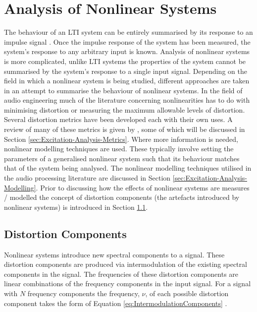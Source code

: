 \section{Analysis of Nonlinear Systems}
\label{sec:Excitation-AnalysisOfNonlinearSystems}
	The behaviour of an LTI system can be entirely summarised by its response to an impulse signal
	\citep{phillips2007signals}. Once the impulse response of the system has been measured, the system's response to any
	arbitrary input is known. Analysis of nonlinear systems is more complicated, unlike LTI systems the properties of
	the system cannot be summarised by the system's response to a single input signal. Depending on the field in which a
	nonlinear system is being studied, different approaches are taken in an attempt to summarise the behaviour of
	nonlinear systems. In the field of audio engineering much of the literature concerning nonlinearities has to do with
	minimising distortion or measuring the maximum allowable levels of distortion. Several distortion metrics have been
	developed each with their own uses. A review of many of these metrics is given by \cite{voishvillo2006assessment},
	some of which will be discussed in Section \ref{sec:Excitation-Analysis-Metrics}. Where more information is needed,
	nonlinear modelling techniques are used. These typically involve setting the parameters of a generalised nonlinear
	system such that its behaviour matches that of the system being analysed. The nonlinear modelling techniques
	utilised in the audio processing literature are discussed in Section \ref{sec:Excitation-Analysis-Modelling}. Prior
	to discussing how the effects of nonlinear systems are measures / modelled the concept of distortion components (the
	artefacts introduced by nonlinear systems) is introduced in Section \ref{sec:Excitation-Analysis-Components}.

	\subsection{Distortion Components}
	\label{sec:Excitation-Analysis-Components}
		Nonlinear systems introduce new spectral components to a signal. These distortion components are produced
		via intermodulation of the existing spectral components in the signal. The frequencies of these distortion
		components are linear combinations of the frequency components in the input signal. For a signal with $N$
		frequency components the frequency, $\nu$, of each possible distortion component takes the form of Equation
		\ref{eq:IntermodulationComponents} \citep{hulick2005solid}.

